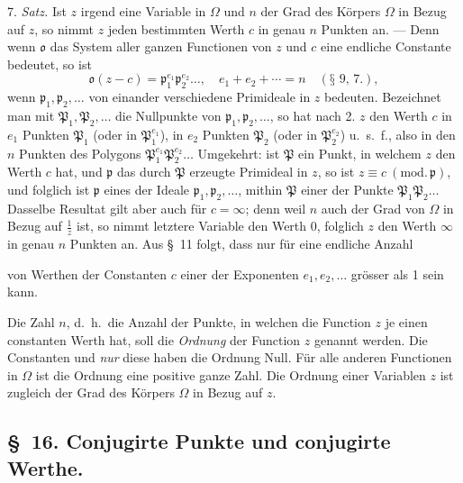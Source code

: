 \documentclass{article}
\begin{document}
7. \emph{Satz.} Ist $z$ irgend eine Variable in $\Omega$ und $n$ der Grad des Körpers $\Omega$ in Bezug auf $z$, so nimmt $z$ jeden bestimmten Werth $c$ in genau $n$ Punkten an. --- Denn wenn $\mathfrak{o}$ das System aller ganzen Functionen von $z$ und $c$ eine endliche Constante bedeutet, so ist
\[ \mathfrak{o}(z-c) = \mathfrak{p}_{1}^{e_{1}}\mathfrak{p}_{2}^{e_{2}}\ldots, \quad e_{1} + e_{2} + \cdots = n \quad (\text{§~9, 7.}), \]
wenn $\mathfrak{p}_{1}, \mathfrak{p}_{2}, \ldots$ von einander verschiedene Primideale in $z$ bedeuten. Bezeichnet man mit $\mathfrak{P}_{1}, \mathfrak{P}_{2}, \ldots$ die Nullpunkte von $\mathfrak{p}_{1}, \mathfrak{p}_{2}, \ldots$, so hat nach 2. $z$ den Werth $c$ in $e_{1}$ Punkten $\mathfrak{P}_{1}$ (oder in $\mathfrak{P}_{1}^{e_{1}}$), in $e_{2}$ Punkten $\mathfrak{P}_{2}$ (oder in $\mathfrak{P}_{2}^{e_{2}}$) u.\ s.\ f., also in den $n$ Punkten des Polygons $\mathfrak{P}_{1}^{e_{1}}\mathfrak{P}_{2}^{e_{2}}\ldots$ Umgekehrt: ist $\mathfrak{P}$ ein Punkt, in welchem $z$ den Werth $c$ hat, und $\mathfrak{p}$ das durch $\mathfrak{P}$ erzeugte Primideal in $z$, so ist $z \equiv c \ (\text{mod.}\,\mathfrak{p})$, und folglich ist $\mathfrak{p}$ eines der Ideale $\mathfrak{p}_{1}, \mathfrak{p}_{2}, \ldots$, mithin $\mathfrak{P}$ einer der Punkte $\mathfrak{P}_{1}\mathfrak{P}_{2}\ldots$ Dasselbe Resultat gilt aber auch für $c = \infty$; denn weil $n$ auch der Grad von $\Omega$ in Bezug auf $\frac{1}{z}$ ist, so nimmt letztere Variable den Werth 0, folglich $z$ den Werth $\infty$ in genau $n$ Punkten an. Aus §~11 folgt, dass nur für eine endliche Anzahl

von Werthen der Constanten $c$ einer der Exponenten $e_{1}, e_{2}, \ldots$ grösser als 1 sein kann.

Die Zahl $n$, d.\ h.\ die Anzahl der Punkte, in welchen die Function $z$ je einen constanten Werth hat, soll die \emph{Ordnung} der Function $z$ genannt werden. Die Constanten und \emph{nur} diese haben die Ordnung Null. Für alle anderen Functionen in $\Omega$ ist die Ordnung eine positive ganze Zahl. Die Ordnung einer Variablen $z$ ist zugleich der Grad des Körpers $\Omega$ in Bezug auf $z$.

\subsection*{§~16. Conjugirte Punkte und conjugirte Werthe.}
\end{document}
